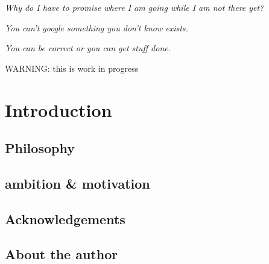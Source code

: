 \documentclass[a4paper]{article}
\begin{document}

\vspace{7cm}

\begin{center}
{\sl Why do I have to promise where I am going while I am not there yet?}

\vspace{1cm}

{\sl You can't google something you don't know exists.}

\vspace{1cm}

{\sl You can be correct or you can get stuff done.}
\end{center}





\newpage
\maketitle
\tableofcontents
\newpage
\begin{center}
{\color{red} \huge WARNING: this is work in progress}
\end{center}

\section{Introduction} %
\subsection{Philosophy}  %
\subsection{ambition \& motivation}  %
\subsection{Acknowledgements}  %
\subsection{About the author}  %
\end{document}
